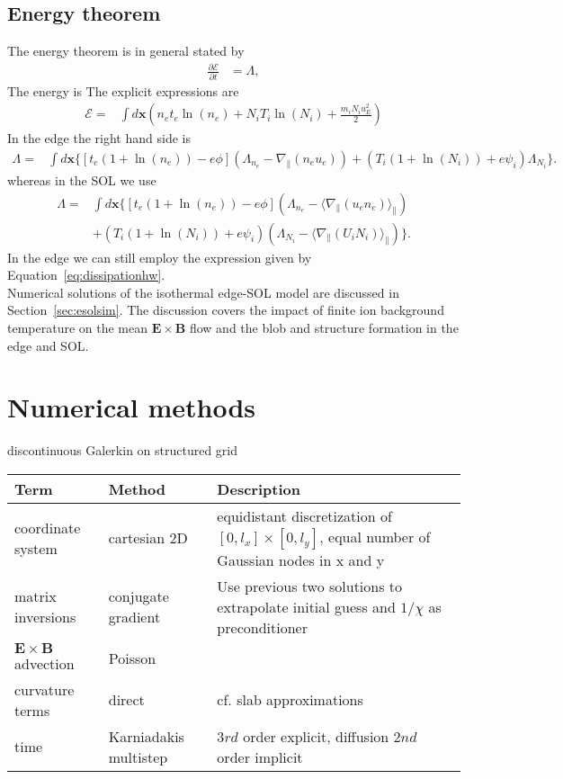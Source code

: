 \documentclass{hitec} %
\renewcommand{\vec}[1]{\boldsymbol{#1}}
\newcommand{\ExB}{$\bm{E}\times\bm{B} \,$}
\begin{document}
\subsection{Energy theorem}
The energy theorem is in general stated by
\begin{align}\label{eq:energytheorem}
 \frac{\partial \mathcal{E} }{\partial t} &= \Lambda,
\end{align}
The energy is 
The explicit expressions are
\begin{align}\label{eq:energyhw}
  \mathcal{E} =& \int d\vec{x} \left(n_e t_{e} \ln (n_e) +N_i T_{i} \ln (N_i)  + \frac{m_i N_i u_E^2}{2} \right) 
  \end{align}
  In the edge the right hand side is
  \begin{align}
\label{eq:dissipationhw}
\Lambda = &
 \int d\vec{x} \bigg\{\left[t_{e} (1+\ln (n_e))  - e \phi \right] \left(\Lambda_{n_e}-\nabla_\parallel \left(n_e u_e\right)\right)  +\left(T_{i}  (1+\ln (N_i))+ e \psi_i \right) \Lambda_{N_i}  \bigg\}.
\end{align}
whereas in the SOL we use
\begin{align}
\Lambda = &
 \int d\vec{x} \bigg\{\left[t_{e} (1+\ln (n_e))  - e \phi \right] \left(\Lambda_{n_e}- \langle \nabla_\parallel (u_e n_e)  \rangle_\parallel 
\right)  
\nonumber \\ &
+\left(T_{i}  (1+\ln (N_i))+ e \psi_i \right) \left(\Lambda_{N_i}-   \langle \nabla_\parallel (U_i N_i)   \rangle_\parallel
  \right)\bigg\}.
\end{align}
In the edge we can still employ the expression given by Equation~\eqref{eq:dissipationhw}. \\
Numerical solutions of the isothermal edge-SOL model are discussed in Section~\ref{sec:esolsim}. The discussion covers the impact of finite ion background temperature on the mean \(\vec{E}\times\vec{B}\) flow and
the blob and structure formation in the edge and SOL.\section{Numerical methods}
discontinuous Galerkin on structured grid 
\begin{longtable}{ll>{\RaggedRight}p{7cm}}
\toprule
\rowcolor{gray!50}\textbf{Term} &  \textbf{Method} & \textbf{Description}  \\ \midrule
coordinate system & cartesian 2D & equidistant discretization of $[0,l_x] \times [0,l_y]$, equal number of Gaussian nodes in x and y \\
matrix inversions & conjugate gradient & Use previous two solutions to extrapolate initial guess and $1/\chi$ as preconditioner \\
\ExB advection & Poisson & \\
curvature terms & direct & cf. slab approximations \\
time &  Karniadakis multistep & $3rd$ order explicit, diffusion $2nd$ order implicit \\
\bottomrule
\end{longtable}
\end{document}
